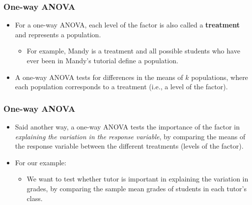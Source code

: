 \documentclass[12pt]{beamer}
\begin{document}
\begin{frame}
	\frametitle{One-way ANOVA}
	
	\begin{itemize}[label={\color{blue}$\blacktriangleright$}]
		\item For a one-way ANOVA, each level of the factor is also called a \textbf{treatment} and represents a population.
		\begin{itemize}[label={\color{blue}$\blacktriangleright$}]
			\item For example, Mandy is a treatment and all possible students who have ever been in Mandy's tutorial define a population.
		\end{itemize}
		
		\item A one-way ANOVA tests for differences in the means of $k$ populations, where each population corresponds to a treatment (i.e., a level of the factor).
	\end{itemize}
	
\end{frame}
\begin{frame}
	\frametitle{One-way ANOVA}
	
	\begin{itemize}[label={\color{blue}$\blacktriangleright$}]
		\item Said another way, a one-way ANOVA tests the importance of the factor in \textit{explaining the variation in the response variable}, by comparing the means of the response variable between the different treatments (levels of the factor).
		
		\item For our example:
		\begin{itemize}[label={\color{blue}$\blacktriangleright$}]
			\item We want to test whether tutor is important in explaining the variation in grades, by comparing the sample mean grades of students in each tutor's class.
		\end{itemize}
	\end{itemize}
	
\end{frame}
\end{document}
